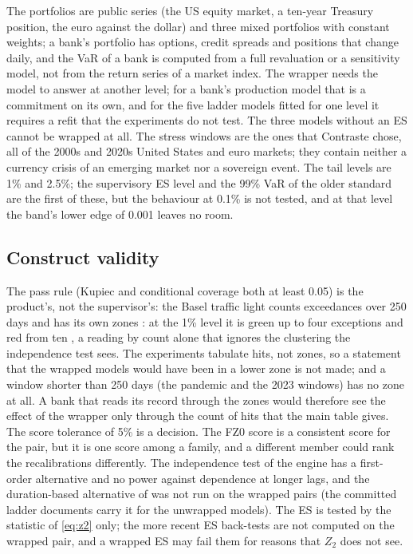 The portfolios are public series (the US equity market, a ten-year Treasury position, the euro against the dollar) and three mixed portfolios with constant weights; a bank's portfolio has options, credit spreads and positions that change daily, and the VaR of a bank is computed from a full revaluation or a sensitivity model, not from the return series of a market index. The wrapper needs the model to answer at another level; for a bank's production model that is a commitment on its own, and for the five ladder models fitted for one level it requires a refit that the experiments do not test. The three models without an ES cannot be wrapped at all. The stress windows are the ones that Contraste chose, all of the 2000s and 2020s United States and euro markets; they contain neither a currency crisis of an emerging market nor a sovereign event. The tail levels are 1\% and 2.5\%; the supervisory ES level and the 99\% VaR of the older standard are the first of these, but the behaviour at 0.1\% is not tested, and at that level the band's lower edge of 0.001 leaves no room.

\subsection{Construct validity}
\label{sec:limits-construct}

The pass rule (Kupiec and conditional coverage both at least 0.05) is the product's, not the supervisor's: the Basel traffic light counts exceedances over 250 days and has its own zones \citep{bcbsmar32}: at the 1\% level it is green up to four exceptions and red from ten \citep{bcbs1996}, a reading by count alone that ignores the clustering the independence test sees. The experiments tabulate hits, not zones, so a statement that the wrapped models would have been in a lower zone is not made; and a window shorter than 250 days (the pandemic and the 2023 windows) has no zone at all. A bank that reads its record through the zones would therefore see the effect of the wrapper only through the count of hits that the main table gives. The score tolerance of 5\% is a decision. The FZ0 score is a consistent score for the pair, but it is one score among a family, and a different member could rank the recalibrations differently. The independence test of the engine has a first-order alternative and no power against dependence at longer lags, and the duration-based alternative of \citet{christoffersenpelletier2004} was not run on the wrapped pairs (the committed ladder documents carry it for the unwrapped models). The ES is tested by the statistic of \cref{eq:z2} only; the more recent ES back-tests \citep{duescanciano2017,kratz2018,bayer2022,wang2022} are not computed on the wrapped pair, and a wrapped ES may fail them for reasons that $Z_2$ does not see.

